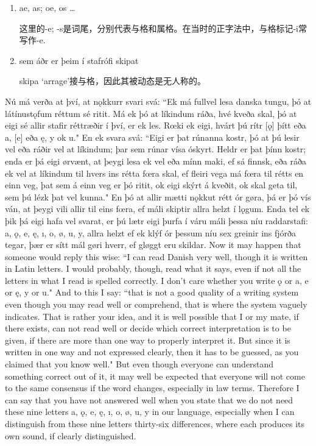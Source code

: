 \begin{grammar*}{}
    \begin{enumerate}[leftmargin=*]
        \item ae, as; oe, os {\dots}

              这里的-e; -s是词尾，分别代表与格和属格。在当时的正字法中，与格标记-i常写作-e.

        \item sem áðr er þeim í stafrófi skipat

              skipa `arrage'接与格，因此其被动态是无人称的。
    \end{enumerate}
\end{grammar*}
\begin{paracol}{2}
    Nú má verða at því, at nǫkkurr svari svá: ``Ek má fullvel lesa danska tungu, þó at látínustǫfum réttum sé ritit. Má ek þó at líkindum ráða, hvé kveða skal, þó at eigi sé allir stafir réttræðir í því, er ek les. Rœki ek eigi, hvárt þú rítr [ǫ] þítt eða a, [e] eða ę, y ok u." En ek svara svá: ``Eigi er þat rúnanna kostr, þó at þú lesir vel eða ráðir vel at líkindum; þar sem rúnar vísa óskyrt. Heldr er þat þínn kostr; enda er þá eigi ørvænt, at þeygi lesa ek vel eða mínn maki, ef sá finnsk, eða ráða ek vel at líkindum til hvers ins rétta fœra skal, ef fleiri vega má fœra til rétts en einn veg, þat sem á einn veg er þó ritit, ok eigi skýrt á kveðit, ok skal geta til, sem þú lézk þat vel kunna." En þó at allir mætti nǫkkut rétt ór gøra, þá er þó vís ván, at þeygi vili allir til eins fœra, ef máli skiptir allra helzt í lǫgum. Enda tel ek þik þá eigi hafa vel svarat, er þú lætr eigi þurfa í váru máli þessa níu raddarstafi: a, ǫ, e, ę, ı, o, ø, u, y, allra helzt ef ek klýf ór þessum níu sex greinir ins fjórða tegar, þær er sítt mál gøri hverr, ef gløggt eru skildar.
    \switchcolumn
    Now it may happen that someone would reply this wise: ``I can read Danish very well, though it is written in Latin letters. I would probably, though, read what it says, even if not all the letters in what I read is spelled correctly. I don't care whether you write ǫ or a, e or ę, y or u." And to this I say: ``that is not a good quality of a writing system even though you may read well or comprehend, that is where the system vaguely indicates. That is rather your idea, and it is well possible that I or my mate, if there exists, can not read well or decide which correct interpretation is to be given, if there are more than one way to properly interpret it. But since it is written in one way and not expressed clearly, then it has to be guessed, as you claimed that you know well." But even though everyone can understand something correct out of it, it may well be expected that everyone will not come to the same consensus if the word changes, especially in law terms. Therefore I can say that you have not answered well when you state that we do not need these nine letters a, ǫ, e, ę, ı, o, ø, u, y in our language, especially when I can distinguish from these nine letters thirty-six differences, where each produces its own sound, if clearly distinguished.
\end{paracol}
